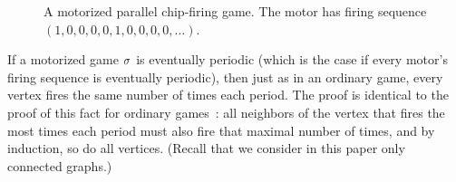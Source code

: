 \begin{centering}
\begin{figure}[tbh]
  \caption{A motorized parallel chip-firing game. The motor has firing sequence
    $(1,0,0,0,0,1,0,0,0,0,\dots)$.}
  \label{motorizedTreeNoGlider}
\end{figure}
\end{centering}

If a motorized game $\sigma$ is eventually periodic (which is the case if every
motor's firing sequence is eventually periodic), then just as in an ordinary
game, every vertex fires the same number of times each period.  The proof is
identical to the proof of this fact for ordinary games~\cite{jiang}: all
neighbors of the vertex that fires the most times each period must also fire
that maximal number of times, and by induction, so do all vertices. (Recall
that we consider in this paper only connected graphs.)

